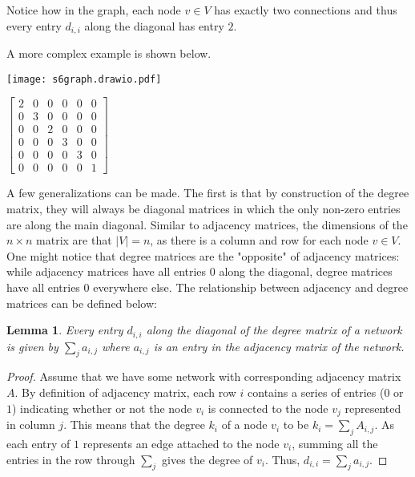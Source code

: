 \documentclass{article}
\newtheorem{lemma}[theorem]{Lemma}
\begin{document}
\bigskip

Notice how in the graph, each node $v\in V$ has exactly two connections and thus every entry $d_{i, i}$ along the diagonal has entry $2$.


\bigskip

\noindent A more complex example is shown below.

\bigskip

\noindent\begin{minipage}{.5\textwidth}
\centering
\texttt{[image: s6graph.drawio.pdf]}
\label{fig:fig5}            
\end{minipage}%
\begin{minipage}{.5\textwidth}
\centering
\vspace{0.5cm}
$\begin{bmatrix}
2 & 0 & 0 & 0 & 0 & 0\\
0 & 3 & 0 & 0 & 0 & 0\\
0 & 0 & 2 & 0 & 0 & 0\\
0 & 0 & 0 & 3 & 0 & 0\\
0 & 0 & 0 & 0 & 3 & 0\\
0 & 0 & 0 & 0 & 0 & 1
\end{bmatrix}$
\vspace{0.5cm}

\label{fig:fig6}            
\end{minipage}

\bigskip

A few generalizations can be made. The first is that by construction of the degree matrix, they will always be diagonal matrices in which the only non-zero entries are along the main diagonal. 
Similar to adjacency matrices, the dimensions of the $n \times n$ matrix are that $|V| = n$, as there is a column and row for each node $v \in V$.
One might notice that degree matrices are the "opposite" of adjacency matrices: while adjacency matrices have all entries $0$ along the diagonal, degree matrices have all entries $0$ everywhere else. 
The relationship between adjacency and degree matrices can be defined below:

\begin{lemma}
Every entry $d_{i,i}$ along the diagonal of the degree matrix of a network is given by $\sum_j a_{i,j}$ where $a_{i,j}$ is an entry in the adjacency matrix of the network.
\end{lemma}

\begin{proof}
Assume that we have some network with corresponding adjacency matrix $A$. 
By definition of adjacency matrix, each row $i$ contains a series of entries ($0$ or $1$) indicating whether or not the node $v_i$ is connected to the node $v_j$ represented in column $j$. 
This means that the degree $k_i$ of a node $v_i$ to be $ k_{i} = \sum_j A_{i,j} $.
As each entry of $1$ represents an edge attached to the node $v_i$, summing all the entries in the row through $\sum_j$ gives the degree of $v_i$. 
Thus, $d_{i,i} = \sum_j a_{i,j}$.

\end{proof}
\end{document}

